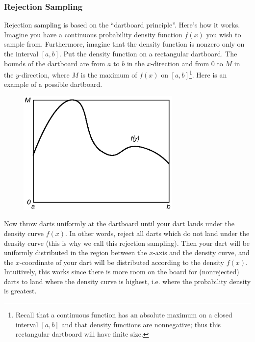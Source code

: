 \documentclass[notes.tex]{subfiles}
\begin{document}
\subsubsection{Rejection Sampling}
Rejection sampling is based on the ``dartboard principle''. Here's how it works. Imagine you have a continuous probability density function $f(x)$ you wish to sample from. Furthermore, imagine that the density function is nonzero only on the interval $[a, b]$. Put the density function on a rectangular dartboard. The bounds of the dartboard are from $a$ to $b$ in the $x$-direction and from $0$ to $M$ in the $y$-direction, where $M$ is the maximum of $f(x)$ on $[a, b]$\footnote{Recall that a continuous function has an absolute maximum on a closed interval $[a, b]$ and that density functions are nonnegative; thus this rectangular dartboard will have finite size.}. Here is an example of a possible dartboard.
\begin{figure}[H]
\centering
\includegraphics[width=8cm]{rejection1}
\end{figure}
Now throw darts uniformly at the dartboard until your dart lands under the density curve $f(x)$. In other words, reject all darts which do not land under the density curve (this is why we call this rejection sampling). Then your dart will be uniformly distributed in the region between the $x$-axis and the density curve, and the $x$-coordinate of your dart will be distributed according to the density $f(x)$. Intuitively, this works since there is more room on the board for (nonrejected) darts to land where the density curve is highest, i.e. where the probability density is greatest.\\
\end{document}
